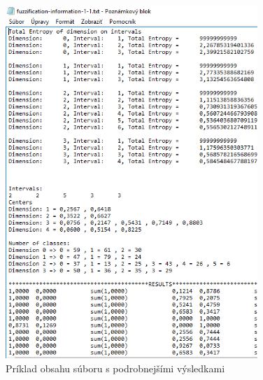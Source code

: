 \begin{figure}[hp!]
\includegraphics[width=0.85\textwidth]{obrazky/obsah_suboru_-_fuzzification-information.PNG}
\centering
\caption{Príklad obsahu súboru s podrobnejšími výsledkami} 
\label{fig:vysledky_subor_dalsie}
\end{figure}




